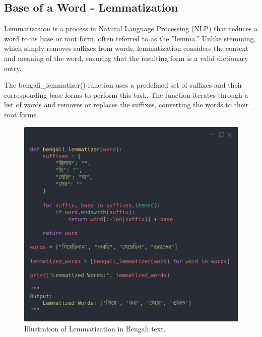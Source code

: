 \subsection{Base of a Word - Lemmatization}

Lemmatization is a process in Natural Language Processing (NLP) that reduces a word to its base or root form, often referred to as the ”lemma.” Unlike stemming, which simply removes suffixes from words, lemmatization considers the context and meaning of the word, ensuring that the resulting form is a valid dictionary entry.

The bengali\_lemmatizer() function uses a predefined set of suffixes and their corresponding base forms to perform this task. The function iterates through a list of words and removes or replaces the suffixes, converting the words to their root forms.

\begin{figure}[H]
    \centering
    \includegraphics[width=0.8\linewidth]{Attachments/Figures/base-of-a-word_figure1.png}
    \caption{Illustration of Lemmatization in Bengali text.}
\end{figure}